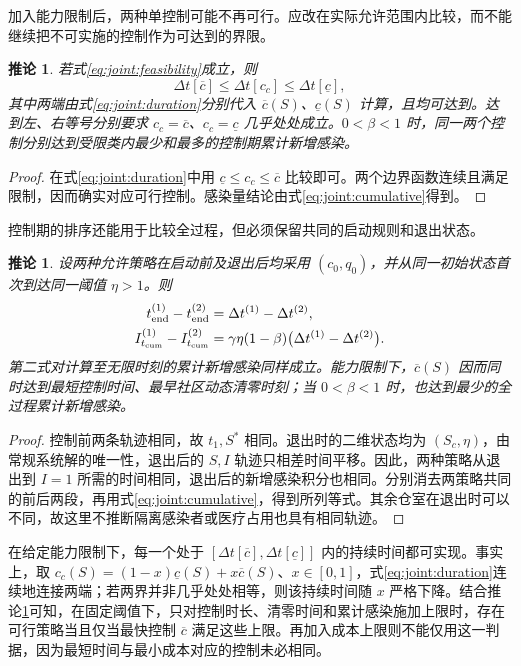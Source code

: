 \documentclass[lang=cn,a4paper,newtx]{elegantpaper}
\numberwithin{equation}{section}
\theoremstyle{plain}
\newtheorem{corollaryn}[theorem]{推论}
\newcommand{\Itcum}{I_{t_{\mathrm{cum}}}}
\begin{document}
加入能力限制后，两种单控制可能不再可行。应改在实际允许范围内比较，而不能继续把不可实施的控制作为可达到的界限。
\begin{corollaryn}
\label{cor:joint:capped-comparison}
若式\eqref{eq:joint:feasibility}成立，则
\begin{equation}
\Delta t[\overline c]\le\Delta t[c_c]\le\Delta t[\underline c],
\label{eq:joint:capped-duration}
\end{equation}
其中两端由式\eqref{eq:joint:duration}分别代入 $\overline c(S)$、$\underline c(S)$ 计算，且均可达到。达到左、右等号分别要求 $c_c=\overline c$、$c_c=\underline c$ 几乎处处成立。$0<\beta<1$ 时，同一两个控制分别达到受限类内最少和最多的控制期累计新增感染。
\end{corollaryn}
\begin{proof}
在式\eqref{eq:joint:duration}中用 $\underline c\le c_c\le\overline c$ 比较即可。两个边界函数连续且满足限制，因而确实对应可行控制。感染量结论由式\eqref{eq:joint:cumulative}得到。
\end{proof}

控制期的排序还能用于比较全过程，但必须保留共同的启动规则和退出状态。
\begin{corollaryn}
\label{cor:joint:whole-epidemic}
设两种允许策略在启动前及退出后均采用 $(c_0,q_0)$，并从同一初始状态首次到达同一阈值 $\eta>1$。则
\begin{align}
t_{\rm end}^{(1)}-t_{\rm end}^{(2)}
&=\Delta t^{(1)}-\Delta t^{(2)},\label{eq:joint:whole-time}\\
\Itcum^{(1)}-\Itcum^{(2)}
&=\gamma\eta(1-\beta)\bigl(\Delta t^{(1)}-\Delta t^{(2)}\bigr).
\label{eq:joint:whole-cumulative}
\end{align}
第二式对计算至无限时刻的累计新增感染同样成立。能力限制下，$\overline c(S)$ 因而同时达到最短控制时间、最早社区动态清零时刻；当 $0<\beta<1$ 时，也达到最少的全过程累计新增感染。
\end{corollaryn}
\begin{proof}
控制前两条轨迹相同，故 $t_1,S^*$ 相同。退出时的二维状态均为 $(S_c,\eta)$，由常规系统解的唯一性，退出后的 $S,I$ 轨迹只相差时间平移。因此，两种策略从退出到 $I=1$ 所需的时间相同，退出后的新增感染积分也相同。分别消去两策略共同的前后两段，再用式\eqref{eq:joint:cumulative}，得到所列等式。其余仓室在退出时可以不同，故这里不推断隔离感染者或医疗占用也具有相同轨迹。
\end{proof}

在给定能力限制下，每一个处于
$[\Delta t[\overline c],\Delta t[\underline c]]$ 内的持续时间都可实现。事实上，取
$c_c(S)=(1-x)\underline c(S)+x\overline c(S)$、$x\in[0,1]$，式\eqref{eq:joint:duration}连续地连接两端；若两界并非几乎处处相等，则该持续时间随 $x$ 严格下降。结合推论\ref{cor:joint:whole-epidemic}可知，在固定阈值下，只对控制时长、清零时间和累计感染施加上限时，存在可行策略当且仅当最快控制 $\overline c$ 满足这些上限。再加入成本上限则不能仅用这一判据，因为最短时间与最小成本对应的控制未必相同。
\end{document}
